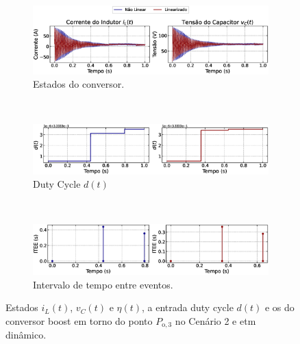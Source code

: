 \begin{figure}[H]
  \centering
  \captionsetup{justification=centering}
  \begin{subfigure}{1.\textwidth}
    \centering
    \includegraphics[width=1.\textwidth]{figuras/dynamic-etm/boost/sim2/op1/result.eps}
    \caption{Estados do conversor.}
    \label{fig:boost_converter_variable_pcpl_dynamic_etm_op1_a}
  \end{subfigure}
  \\[6pt]
  \begin{subfigure}{1.\textwidth}
    \centering
    \includegraphics[width=1.\textwidth]{figuras/dynamic-etm/boost/sim2/op1/duty-cycle.eps}
    \caption{Duty Cycle $d(t)$}
    \label{fig:boost_converter_variable_pcpl_dynamic_etm_op1_b}
  \end{subfigure}
  \\[6pt]
  \begin{subfigure}{1.\textwidth}
    \centering
    \includegraphics[width=1.\textwidth]{figuras/dynamic-etm/boost/sim2/op1/inter-event-times.eps}
    \caption{Intervalo de tempo entre eventos.}
    \label{fig:boost_converter_variable_pcpl_dynamic_etm_op1_c}
  \end{subfigure}
  \caption{Estados $i_L(t)$, $v_C(t)$ e $\eta(t)$, a entrada duty cycle $d(t)$ e os  do conversor boost em torno do ponto $P_{\mathrm{o}, 3}$ no Cenário 2 e \acrshort{etm} dinâmico.}
  \label{fig:boost_converter_variable_pcpl_dynamic_etm_op1}
\end{figure}

